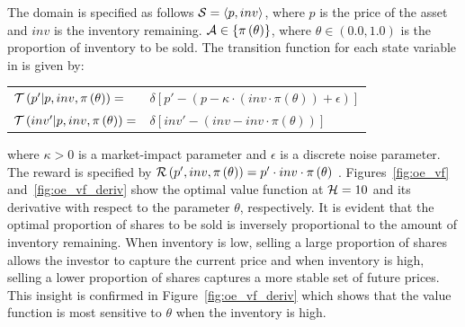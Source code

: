 The domain is specified as follows {\footnotesize $ \mathcal{S} = \left\langle p, inv \right\rangle$}, where $ p $ is the price of the asset and $ inv $ is the inventory remaining. {\footnotesize $ \mathcal{A} \in \left\lbrace \pi\left( \theta \right) \right\rbrace$}, where {\footnotesize $ \theta \in \left( 0.0, 1.0\right)$} is the proportion of inventory to be sold. The transition function {\footnotesize \Transition} for each state variable in {\footnotesize \State} is given by:
{\footnotesize 
    \abovedisplayskip=5pt
    \belowdisplayskip=0pt
    \renewcommand{\arraystretch}{1.5}
    \begin{tabular}{ll}
        $\mathcal{T}\left( p' | p, inv, \pi\left( \theta \right) \right) =$ & $ \delta \left[ p' - (p - \kappa \cdot (inv \cdot \pi\left( \theta \right)) + \epsilon) \right] $ \\
        $\mathcal{T}\left( inv' | p, inv, \pi\left( \theta \right) \right) =$ & $\delta \left[ inv' - (inv - inv \cdot \pi\left( \theta \right)) \right] $ \\
    \end{tabular}
}%
where {\footnotesize $ \kappa > 0$} is a market-impact parameter and {\footnotesize $ \epsilon $} is a discrete noise parameter. The reward is specified by {\footnotesize $ \mathcal{R}\left(p', inv, \pi\left( \theta \right) \right) = p' \cdot inv \cdot \pi\left( \theta \right)$ }. Figures~\ref{fig:oe_vf} and~\ref{fig:oe_vf_deriv} show the optimal value function at {\footnotesize $ \mathcal{H} = 10 $} and its derivative with respect to the parameter {\footnotesize $ \theta$}, respectively. It is 
evident that the optimal proportion of shares to be sold is inversely proportional to the amount of inventory remaining. When inventory is low, selling a large proportion of shares allows the investor to capture the current price and when inventory is high, selling a lower proportion of shares captures a more stable set of future prices.
This insight is confirmed in Figure~\ref{fig:oe_vf_deriv} which shows that the value function is most sensitive to {\footnotesize $\theta$} when the inventory is high.

